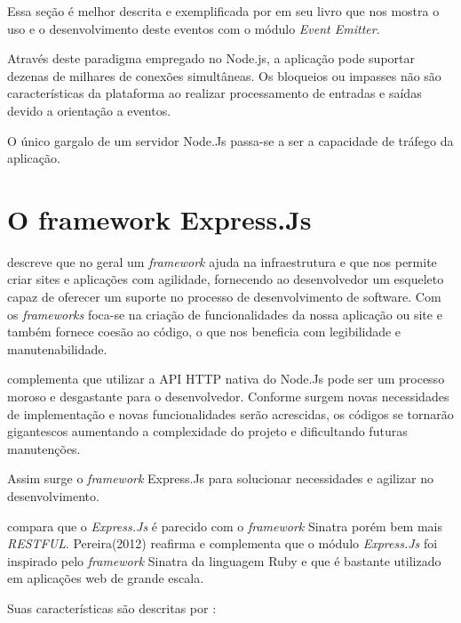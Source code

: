   Essa seção é melhor descrita e exemplificada por  em seu livro que nos mostra o uso e o 
  desenvolvimento deste eventos com o módulo \textit{Event Emitter}.

  Através deste paradigma empregado no Node.js, a aplicação pode 
  suportar dezenas de milhares de conexões simultâneas. Os bloqueios ou impasses não são características da plataforma ao
  realizar processamento de entradas e saídas devido a orientação a eventos. \cite{Abernethy:2011}
  
  O único gargalo de um servidor Node.Js passa-se a ser a capacidade de 
  tráfego da aplicação.\cite{Oliveira:2012} 


\section{O framework Express.Js}
\label{framework-express}

   descreve que no geral um \textit{framework} ajuda na infraestrutura e que nos permite criar sites e aplicações
  com agilidade, fornecendo ao desenvolvedor um esqueleto capaz de oferecer um suporte no processo de desenvolvimento de
  software. Com os \textit{frameworks} foca-se na criação de funcionalidades da nossa aplicação ou site e 
  também fornece coesão ao código, o que nos beneficia com legibilidade e manutenabilidade.

   complementa que utilizar a API HTTP nativa do Node.Js pode ser um processo moroso e desgastante
  para o desenvolvedor. 
  Conforme surgem novas necessidades de implementação e novas funcionalidades serão acrescidas,
  os códigos se tornarão gigantescos aumentando a complexidade do projeto e dificultando futuras manutenções.
  
  Assim surge o \textit{framework} Express.Js para solucionar necessidades e agilizar no desenvolvimento.
  
   compara que o \textit{Express.Js} é parecido com o \textit{framework} Sinatra porém bem mais \textit{RESTFUL}. 
  Pereira(2012) reafirma e complementa que o módulo \textit{Express.Js} foi inspirado pelo \textit{framework} Sinatra da 
  linguagem Ruby e que é bastante utilizado em aplicações web de grande escala.
  
  Suas características são descritas por :
  
